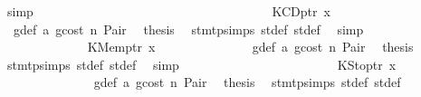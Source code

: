 \begin{isabellebody}
\ simp\isanewline
\ \ \ \ \ \ \ \ \ \ \ \ \isamarkupfalse%
\isanewline
\ \ \ \ \ \ \ \ \ \ \isamarkupfalse%
\isanewline
\ \ \ \ \ \ \ \ \ \ \ \ \isamarkupfalse%
\ {\isacharparenleft}{\kern0pt}KCDptr\ x{}{\isacharparenright}{\kern0pt}\isanewline
\ \ \ \ \ \ \ \ \ \ \ \ \isamarkupfalse%
\ {}{\isacharparenleft}{\kern0pt}{}{\isacharparenright}{\kern0pt}\ g{\isacharunderscore}{\kern0pt}def\ a{}\ gcost\ n\ Pair\ \isamarkupfalse%
\ {\isacharquery}{\kern0pt}thesis\ \isamarkupfalse%
\ stmt{\isachardot}{\kern0pt}psimps{\isacharparenleft}{\kern0pt}{}{\isacharparenright}{\kern0pt}\ st{\isacharprime}{\kern0pt}{\isacharunderscore}{\kern0pt}def\ st{\isacharprime}{\kern0pt}{\isacharprime}{\kern0pt}{\isacharunderscore}{\kern0pt}def\ \isamarkupfalse%
\ simp\isanewline
\ \ \ \ \ \ \ \ \ \ \isamarkupfalse%
\isanewline
\ \ \ \ \ \ \ \ \ \ \ \ \isamarkupfalse%
\ {\isacharparenleft}{\kern0pt}KMemptr\ x{}{\isacharparenright}{\kern0pt}\isanewline
\ \ \ \ \ \ \ \ \ \ \ \ \isamarkupfalse%
\ {}{\isacharparenleft}{\kern0pt}{}{\isacharparenright}{\kern0pt}\ g{\isacharunderscore}{\kern0pt}def\ a{}\ gcost\ n\ Pair\ \isamarkupfalse%
\ {\isacharquery}{\kern0pt}thesis\ \isamarkupfalse%
\ stmt{\isachardot}{\kern0pt}psimps{\isacharparenleft}{\kern0pt}{}{\isacharparenright}{\kern0pt}\ st{\isacharprime}{\kern0pt}{\isacharunderscore}{\kern0pt}def\ st{\isacharprime}{\kern0pt}{\isacharprime}{\kern0pt}{\isacharunderscore}{\kern0pt}def\ \isamarkupfalse%
\ simp\isanewline
\ \ \ \ \ \ \ \ \ \ \isamarkupfalse%
\isanewline
\ \ \ \ \ \ \ \ \ \ \ \ \isamarkupfalse%
\ {\isacharparenleft}{\kern0pt}KStoptr\ x{}{\isacharparenright}{\kern0pt}\isanewline
\ \ \ \ \ \ \ \ \ \ \ \ \isamarkupfalse%
\ {}{\isacharparenleft}{\kern0pt}{}{\isacharparenright}{\kern0pt}\ g{\isacharunderscore}{\kern0pt}def\ a{}\ gcost\ n\ Pair\ \isamarkupfalse%
\ {\isacharquery}{\kern0pt}thesis\ \isamarkupfalse%
\ stmt{\isachardot}{\kern0pt}psimps{\isacharparenleft}{\kern0pt}{}{\isacharparenright}{\kern0pt}\ st{\isacharprime}{\kern0pt}{\isacharunderscore}{\kern0pt}def\ st{\isacharprime}{\kern0pt}{\isacharprime}{\kern0pt}{\isacharunderscore}{\kern0pt}def\ \isamarkupfalse%

\end{isabellebody}
